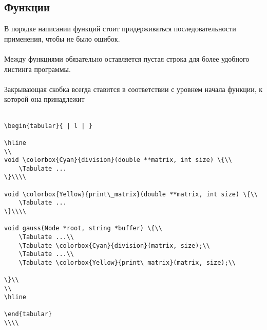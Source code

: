 \documentclass{article}
\begin{document}
\subsection{Функции}
В порядке написании функций стоит придерживаться последовательности применения, чтобы не было ошибок.\\\\
Между функциями обязательно оставляется пустая строка для более удобного листинга программы.\\\\
Закрывающая скобка всегда ставится в соответствии с уровнем начала функции, к которой она принадлежит\\\\
\begin{lstlisting}
\begin{tabular}{ | l | }

\hline
\\
void \colorbox{Cyan}{division}(double **matrix, int size) \{\\
    \Tabulate ...
\}\\\\

void \colorbox{Yellow}{print\_matrix}(double **matrix, int size) \{\\
    \Tabulate ...
\}\\\\

void gauss(Node *root, string *buffer) \{\\
	\Tabulate ...\\
	\Tabulate \colorbox{Cyan}{division}(matrix, size);\\
	\Tabulate ...\\
	\Tabulate \colorbox{Yellow}{print\_matrix}(matrix, size);\\

\}\\
\\
\hline

\end{tabular}
\\\\
\end{lstlisting}
\newpage
\end{document}
